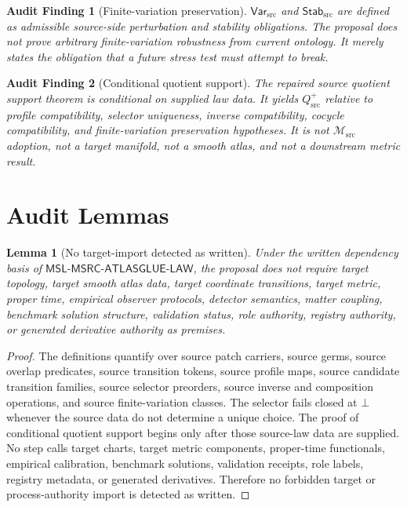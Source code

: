 \documentclass[11pt]{article}
\newcommand{\Msrc}{\mathcal{M}_{\mathrm{src}}}
\newcommand{\MSL}{\mathsf{MSL}\mbox{-}\mathsf{MSRC}\mbox{-}\mathsf{ATLASGLUE}\mbox{-}\mathsf{LAW}}
\newcommand{\Var}{\mathsf{Var}_{\mathrm{src}}}
\newcommand{\Stab}{\mathsf{Stab}_{\mathrm{src}}}
\newcommand{\Qsrc}{Q_{\mathrm{src}}^{+}}
\newcommand{\Bot}{\bot}
\newtheorem{audit}{Audit Finding}
\newtheorem{lemma}{Lemma}
\begin{document}
\begin{audit}[Finite-variation preservation]
\(\Var\) and \(\Stab\) are defined as admissible source-side perturbation and
stability obligations. The proposal does not prove arbitrary finite-variation
robustness from current ontology. It merely states the obligation that a
future stress test must attempt to break.
\end{audit}

\begin{audit}[Conditional quotient support]
The repaired source quotient support theorem is conditional on supplied law
data. It yields \(\Qsrc\) relative to profile compatibility, selector
uniqueness, inverse compatibility, cocycle compatibility, and finite-variation
preservation hypotheses. It is not \(\Msrc\) adoption, not a target manifold,
not a smooth atlas, and not a downstream metric result.
\end{audit}

\section{Audit Lemmas}

\begin{lemma}[No target-import detected as written]
Under the written dependency basis of \(\MSL\), the proposal does not require
target topology, target smooth atlas data, target coordinate transitions,
target metric, proper time, empirical observer protocols, detector semantics,
matter coupling, benchmark solution structure, validation status, role
authority, registry authority, or generated derivative authority as premises.
\end{lemma}

\begin{proof}
The definitions quantify over source patch carriers, source germs, source
overlap predicates, source transition tokens, source profile maps, source
candidate transition families, source selector preorders, source inverse and
composition operations, and source finite-variation classes. The selector
fails closed at \(\Bot\) whenever the source data do not determine a unique
choice. The proof of conditional quotient support begins only after those
source-law data are supplied. No step calls target charts, target metric
components, proper-time functionals, empirical calibration, benchmark
solutions, validation receipts, role labels, registry metadata, or generated
derivatives. Therefore no forbidden target or process-authority import is
detected as written.
\end{proof}
\end{document}
